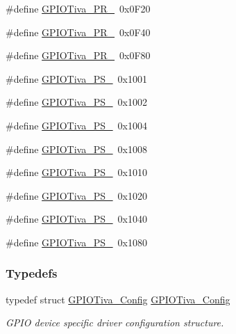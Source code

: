 \begin{DoxyCompactItemize}
\#define \hyperlink{_g_p_i_o_tiva_8h_aadb9d5d8c9b6d70d763fad7c306a6bcb}{G\+P\+I\+O\+Tiva\+\_\+\+P\+R\+\_}~0x0\+F20
\item 
\#define \hyperlink{_g_p_i_o_tiva_8h_a56a24dc8ac95f5df662c3429185cf16e}{G\+P\+I\+O\+Tiva\+\_\+\+P\+R\+\_}~0x0\+F40
\item 
\#define \hyperlink{_g_p_i_o_tiva_8h_a2c3bc3c450a7b8af193751846b798f59}{G\+P\+I\+O\+Tiva\+\_\+\+P\+R\+\_}~0x0\+F80
\item 
\#define \hyperlink{_g_p_i_o_tiva_8h_af49297080a67e9d88ffd29158f2080a8}{G\+P\+I\+O\+Tiva\+\_\+\+P\+S\+\_}~0x1001
\item 
\#define \hyperlink{_g_p_i_o_tiva_8h_a2b5f0d90d1a66596ae4675e78ce98bfe}{G\+P\+I\+O\+Tiva\+\_\+\+P\+S\+\_}~0x1002
\item 
\#define \hyperlink{_g_p_i_o_tiva_8h_a34b02a0b81e790ef2644c914539b6551}{G\+P\+I\+O\+Tiva\+\_\+\+P\+S\+\_}~0x1004
\item 
\#define \hyperlink{_g_p_i_o_tiva_8h_af56551f581e24f5cded842b6650eed84}{G\+P\+I\+O\+Tiva\+\_\+\+P\+S\+\_}~0x1008
\item 
\#define \hyperlink{_g_p_i_o_tiva_8h_afce184d31ecb4550b7a14a0e7f5e5409}{G\+P\+I\+O\+Tiva\+\_\+\+P\+S\+\_}~0x1010
\item 
\#define \hyperlink{_g_p_i_o_tiva_8h_abcc117beb7b01e88b9b569294a33d27e}{G\+P\+I\+O\+Tiva\+\_\+\+P\+S\+\_}~0x1020
\item 
\#define \hyperlink{_g_p_i_o_tiva_8h_acd959ad60e9ad1bd70fe106004c193d3}{G\+P\+I\+O\+Tiva\+\_\+\+P\+S\+\_}~0x1040
\item 
\#define \hyperlink{_g_p_i_o_tiva_8h_a4835c983f7798a8055925dc94e3384c2}{G\+P\+I\+O\+Tiva\+\_\+\+P\+S\+\_}~0x1080
\end{DoxyCompactItemize}
\subsubsection*{Typedefs}
\begin{DoxyCompactItemize}
\item 
typedef struct \hyperlink{struct_g_p_i_o_tiva___config}{G\+P\+I\+O\+Tiva\+\_\+\+Config} \hyperlink{_g_p_i_o_tiva_8h_a16ef6f5670ec58a9fa8a4e8757afc722}{G\+P\+I\+O\+Tiva\+\_\+\+Config}
\begin{DoxyCompactList}\small\item\em G\+P\+I\+O device specific driver configuration structure. \end{DoxyCompactList}\end{DoxyCompactItemize}


